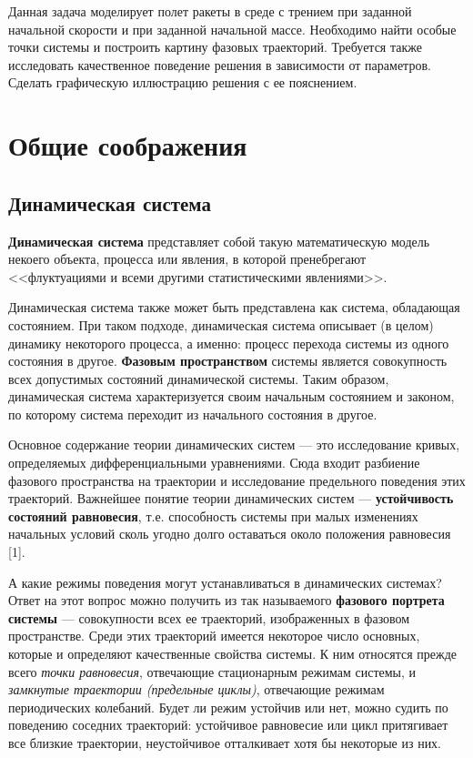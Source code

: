 \documentclass[12pt, a4paper]{article}
\begin{document}
	Данная задача моделирует полет ракеты в среде с трением при заданной начальной скорости и при заданной начальной массе.
	Необходимо найти особые точки системы и построить картину фазовых траекторий. Требуется также исследовать качественное поведение решения в зависимости от параметров. Сделать графическую иллюстрацию решения с ее пояснением.
	\section{Общие соображения}
	\subsection{Динамическая система}
	\textbf{Динамическая система} представляет собой такую математическую модель некоего объекта, процесса или явления, в которой пренебрегают <<флуктуациями и всеми другими статистическими явлениями>>.
	
	Динамическая система также может быть представлена как система, обладающая состоянием. При таком подходе, динамическая система описывает (в целом) динамику некоторого процесса, а именно: процесс перехода системы из одного состояния в другое. \textbf{Фазовым пространством} системы является совокупность всех допустимых состояний динамической системы. Таким образом, динамическая система характеризуется своим начальным состоянием и законом, по которому система переходит из начального состояния в другое.
	
	Основное содержание теории динамических систем --- это исследование кривых, определяемых дифференциальными уравнениями. Сюда входит разбиение фазового пространства на траектории и исследование предельного поведения этих траекторий. Важнейшее понятие теории динамических систем --- \textbf{устойчивость состояний равновесия}, т.е. способность системы при малых изменениях начальных условий сколь угодно долго оставаться около положения равновесия [1].
	
	А какие режимы поведения могут устанавливаться в динамических системах? Ответ на этот вопрос можно получить из так называемого \textbf{фазового портрета системы} --- совокупности всех ее траекторий, изображенных в фазовом пространстве. Среди этих траекторий имеется некоторое число основных, которые и определяют качественные свойства системы. К ним относятся прежде всего \textit{точки равновесия}, отвечающие стационарным режимам системы, и \textit{замкнутые траектории (предельные циклы)}, отвечающие режимам периодических колебаний. Будет ли режим устойчив или нет, можно судить по поведению соседних траекторий: устойчивое равновесие или цикл притягивает все близкие траектории, неустойчивое отталкивает хотя бы некоторые из них.
	
\end{document}
